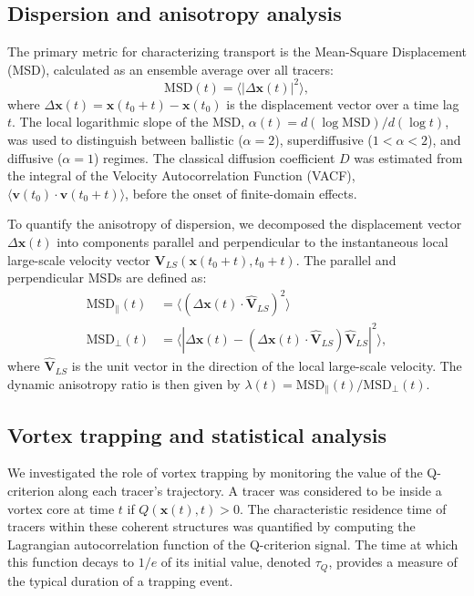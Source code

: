 \documentclass[]{article}
\begin{document}
\subsection{Dispersion and anisotropy analysis}
The primary metric for characterizing transport is the Mean-Square Displacement (MSD), calculated as an ensemble average over all tracers:
\begin{equation}
    \text{MSD}(t) = \langle |\Delta\mathbf{x}(t)|^2 \rangle,
\end{equation}
where $\Delta\mathbf{x}(t) = \mathbf{x}(t_0+t) - \mathbf{x}(t_0)$ is the displacement vector over a time lag $t$. The local logarithmic slope of the MSD, $\alpha(t) = d(\log \text{MSD}) / d(\log t)$, was used to distinguish between ballistic ($\alpha=2$), superdiffusive ($1 < \alpha < 2$), and diffusive ($\alpha=1$) regimes. The classical diffusion coefficient $D$ was estimated from the integral of the Velocity Autocorrelation Function (VACF), $\langle \mathbf{v}(t_0) \cdot \mathbf{v}(t_0+t) \rangle$, before the onset of finite-domain effects.

To quantify the anisotropy of dispersion, we decomposed the displacement vector $\Delta\mathbf{x}(t)$ into components parallel and perpendicular to the instantaneous local large-scale velocity vector $\mathbf{V}_{LS}(\mathbf{x}(t_0+t), t_0+t)$. The parallel and perpendicular MSDs are defined as:
\begin{align}
    \text{MSD}_{\parallel}(t) &= \langle (\Delta\mathbf{x}(t) \cdot \hat{\mathbf{V}}_{LS})^2 \rangle \\
    \text{MSD}_{\perp}(t) &= \langle |\Delta\mathbf{x}(t) - (\Delta\mathbf{x}(t) \cdot \hat{\mathbf{V}}_{LS}) \hat{\mathbf{V}}_{LS}|^2 \rangle,
\end{align}
where $\hat{\mathbf{V}}_{LS}$ is the unit vector in the direction of the local large-scale velocity. The dynamic anisotropy ratio is then given by $\lambda(t) = \text{MSD}_{\parallel}(t) / \text{MSD}_{\perp}(t)$.

\subsection{Vortex trapping and statistical analysis}
We investigated the role of vortex trapping by monitoring the value of the Q-criterion along each tracer's trajectory. A tracer was considered to be inside a vortex core at time $t$ if $Q(\mathbf{x}(t), t) > 0$. The characteristic residence time of tracers within these coherent structures was quantified by computing the Lagrangian autocorrelation function of the Q-criterion signal. The time at which this function decays to $1/e$ of its initial value, denoted $\tau_Q$, provides a measure of the typical duration of a trapping event.
\end{document}
